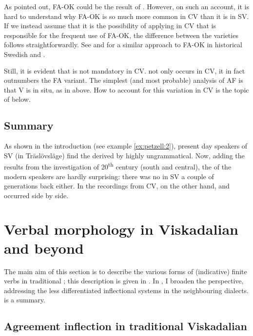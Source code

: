 \documentclass[output=paper,colorlinks,citecolor=brown,draft,draftmode]{langscibook}
\begin{document}
As pointed out, FA-OK could be the result of  . However, on such an account, it is hard to understand why FA-OK is so much more common in CV than it is in SV. If we instead assume that it is the possibility of applying  in CV that is responsible for the frequent use of FA-OK, the difference between the varieties follows straightforwardly. See \citet{Falk1993} and \citet{Sundquist2003} for a similar approach to FA-OK in historical Swedish and . 



Still, it is evident that  is not mandatory in CV.  not only occurs in CV, it in fact outnumbers the FA variant. The simplest (and most probable) analysis of AF is that V is in situ, as in  above. How to account for this variation in CV is the topic of  below.


\subsection{Summary}\label{sec:petzell:2.5}\largerpage[2]


As shown in the introduction (see example \ref{ex:petzell:2}), present day speakers of SV (in Träslövsläge) find the  derived by  highly ungrammatical. Now, adding the results from the investigation of 20\textsuperscript{th} century  (south and central), the  of the modern speakers are hardly surprising: there was no  in SV a couple of generations back either.{} In the recordings from CV, on the other hand,  and  occurred side by side.


\section{Verbal morphology in Viskadalian and beyond}\label{sec:petzell:3}


The main aim of this section is to describe the various forms of (indicative) finite verbs in traditional ; this description is given in . In , I broaden the perspective, addressing the less differentiated inflectional systems in the neighbouring dialects.  is a summary.


\subsection{Agreement inflection in traditional Viskadalian}\label{sec:petzell:3.1}
\end{document}
